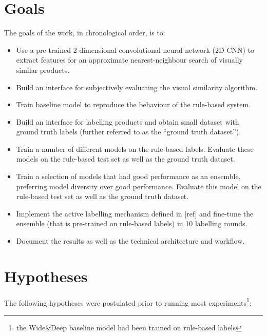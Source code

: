 \section{Goals}

The goals of the work, in chronological order, is to:

\begin{itemize}
  \item Use a pre-trained 2-dimensional convolutional neural network (2D CNN) to extract features for an approximate nearest-neighbour search of visually similar products.
  \item Build an interface for subjectively evaluating the visual similarity algorithm.
  \item Train  baseline model to reproduce the behaviour of the rule-based system.
  \item Build an interface for labelling products and obtain small dataset with ground truth labels (further referred to as the ``ground truth dataset'').
  \item Train a number of different models on the rule-based labels.  Evaluate these models on the rule-based test set as well as the ground truth dataset.
  \item Train a selection of models that had good performance as an ensemble, preferring model diversity over good performance. Evaluate this model on the rule-based test set as well as the ground truth dataset.
  \item Implement the active labelling mechanism defined in [ref] and fine-tune the ensemble (that is pre-trained on rule-based labels) in 10 labelling rounds.
  \item Document the results as well as the technical architecture and workflow.
\end{itemize}

\section{Hypotheses}

The following hypotheses were postulated prior to running most experiments\footnote{the Wide\&Deep baseline model had been trained on rule-based labels}:

